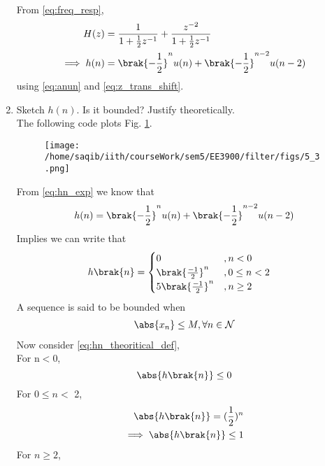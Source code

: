 \documentclass[journal,12pt,twocolumn]{IEEEtran}
\renewcommand\thesection{\arabic{section}}
\begin{document}
\begin{enumerate}[label=\thesection.\arabic*]
\\
\solution From \eqref{eq:freq_resp},
\begin{align}
H(z) &= \frac{1}{1 + \frac{1}{2}z^{-1}} + \frac{ z^{-2}}{1 + \frac{1}{2}z^{-1}}
\\
\implies h(n) &= \brak{-\frac{1}{2}}^{n}u(n) + \brak{-\frac{1}{2}}^{n-2}u(n-2)
\label{eq:hn_exp}
\end{align}
using \eqref{eq:anun} and \eqref{eq:z_trans_shift}.
\item Sketch $h(n)$. Is it bounded? Justify theoretically.
\\
\solution The following code plots Fig. \ref{fig:xnyn}.

\begin{figure}[!ht]
	\begin{center}
	\texttt{[image: /home/saqib/iith/courseWork/sem5/EE3900/filter/figs/5\_3.png]}
	\end{center}
	\label{fig:xnyn}	
\end{figure}
From \eqref{eq:hn_exp} we know that\\
\begin{equation}
	h(n) = \brak{-\frac{1}{2}}^{n}u(n) + \brak{-\frac{1}{2}}^{n-2}u(n-2)
\end{equation}
Implies we can write that\\
\begin{align}
	h\brak{n} &= \begin{cases}
					 0 &, n < 0\\
					 \brak{\frac{-1}{2}}^n &, 0\leq n<2\\
					 5\brak{\frac{-1}{2}}^n &, n \geq 2
				  \end{cases}\label{eq:hn_theoritical_def}
\end{align}
A sequence is said to be bounded when 
\begin{align}
	\abs{x_n} \leq M , \forall n \in \mathcal{N}\label{def:bounded_seq_def}
\end{align}  
Now consider \eqref{eq:hn_theoritical_def},\\
For n$<$0,
\begin{equation}
	\abs{h\brak{n}} \leq 0
\end{equation}
For $0 \leq n <$ 2,
\begin{align}
	\abs{h\brak{n}} = (\frac{1}{2})^n\\
	\implies \abs{h\brak{n}} \leq 1
\end{align}
For $n\geq 2$,
\begin{align}

\end{align}
\end{enumerate}
\end{document}
